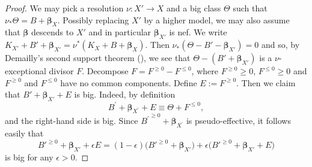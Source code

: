 \documentclass[11pt]{amsart}
\numberwithin{equation}{section}
\def\bbeta{\boldsymbol{\beta}}
\theoremstyle{definition}
\theoremstyle{definition}
\theoremstyle{definition}
\begin{document}
\begin{proof} We may pick a resolution $\nu: X'\to X$ and a big class $\Theta$ such that $\nu _* \Theta =B+\bbeta _X$. Possibly replacing $X'$ by a higher model, we may also assume that $\bbeta$ descends to $X'$ and in particular $\bbeta _{X'}$ is nef. We write $K_{X'}+B'+\bbeta _{X'}=\nu ^*(K_X+B+\bbeta_X)$. Then $\nu _*(\Theta -B'-\bbeta _{X'})=0$ and so, by Demailly's second support theorem (\cite[Proposition (2.13)]{agbook}), we see that $ \Theta-(B'+\bbeta_{X'})$ is a $\nu$-exceptional divisor $F$. Decompose $F = F^{\ge 0}- F^{\le 0}$, where $F^{\ge 0}\ge 0$, $F^{\le 0}\ge 0$ and $F^{\ge 0}$ and $F^{\le 0}$ have no common components. Define $E:= F^{\ge 0}$. Then we claim that $B'+\bbeta_{X'}+E$ is big. Indeed, by definition
$$B^{\prime}+\bbeta_{X^{\prime}}+E \equiv \Theta+F^{\le 0},$$
and the right-hand side is big. Since ${B^{\prime}}^{\geq 0}+\bbeta_{X^{\prime}}$ is pseudo-effective, it follows easily that \[B'^{\geq 0}+\bbeta_{X'} +\epsilon E=(1-\epsilon)\big(B'^{\ge0}+\bbeta_{X'}\big)+\epsilon\big(B'^{\ge0}+\bbeta_{X'}+E\big)\] is big for any $\epsilon >0$. 
\end{proof}
\end{document}
